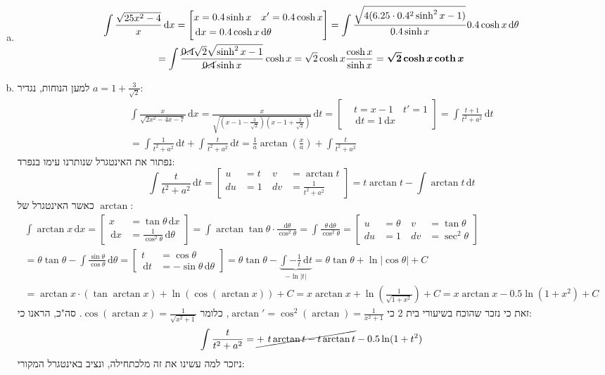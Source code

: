 \documentclass[]{article}
\newcommand\tant  {\tan \theta}
\newcommand\sinhx {\sinh x}
\newcommand\coshx {\cosh x}
\newcommand\dx    {\,\mathrm{d}x}
\newcommand\dt    {\,\mathrm{d}t}
\newcommand\dtt   {\,\mathrm{d}\theta}
\newcommand\pt[3]{\csb{\begin{aligned}
			&t = #1 \quad t' = #2 \\
			&\dt = #2 \dx #3
\end{aligned}}}
\newcommand\pts[2]{\csb{\begin{aligned}
t &= #1 \quad \\
\dt &= #2
\end{aligned}}}
\newcommand\px[3]{\csb{\begin{aligned}
&x = #1 \quad x' = #2 \\
&\dx = #2 #3
\end{aligned}}}
\newcommand\pxs[2]{\csb{\begin{aligned}
x &= #1\\
\dx &= #2
\end{aligned}}}
\newcommand\udv[4]{\csb{\begin{aligned}
			u &= #1  \ & v &= #3 \\
			du &= #2 \ & dv &= #4
\end{aligned}}}
\newcommand\ta    {\theta}
\newcommand\cl [1]    {\left ( #1 \right )}
\newcommand\csb[1]    {\left [ #1 \right ]}
\begin{document}
	\section{}
	\begin{enumerate}[a.]
		\item 
			\begin{multline*}
				\int \frac{\sqrt{25x^2 - 4}}{x}\dx = \px{0.4\sinhx}{0.4\coshx}{\dtt} = \int \frac{\sqrt{4(6.25 \cdot 0.4^2\sinh^2x - 1)}}{0.4\sinhx} 0.4\coshx\dtt \\
				= \int \frac{\cancel{0.4}\sqrt2\sqrt{\sinh^2x - 1}}{\cancel{0.4}\sinhx}\coshx = \sqrt{2}\coshx \frac{\coshx}{\sinhx} = \bm{\sqrt2 \coshx \coth x}
			\end{multline*}
		\item למען הנוחות, נגדיר $a = 1 + \frac{3}{\sqrt2}$: 
			\begin{multline*}
				\int \frac{x}{\sqrt{2x^2 - 4x - 7}} \dx = \frac{x}{\sqrt{\cl{x - 1 - \frac{3}{\sqrt2}}\cl{x - 1 + \frac{3}{\sqrt2}}}} \dt = \pt{x - 1}{1}{} = \int \frac{t + 1}{t^2 + a^2}\dt \\
				= \int \frac{1}{t^2 + a^2} \dt + \int \frac{t}{t^2 + a^2} \dt = \frac{1}{a}\arctan\cl{\frac{x}{a}} + \int \frac{t}{t^2 + a^2}
			\end{multline*}
			נפתור את האינטגרל שנותרנו עימו בנפרד: 
			\[ \int \frac{t}{t^2 + a^2} \dt = \udv{t}{1}{\arctan t}{\tfrac{1}{t^2 + a^2}} = t \arctan t - \int \arctan t \dt \]
			כאשר האינטגרל של $\arctan$: 
			\begin{multline*}
				\int \arctan x \dx = \pxs{\tant\dx}{\tfrac{1}{\cos^2\ta}\dtt} = \int \arctan \tant \cdot \frac{\dtt}{\cos^2 \ta} = \int \frac{\ta \dtt}{\cos^2\ta} = \udv{\ta}{1}{\tan\ta}{\sec^2\ta} \\
				= \ta \tan \ta - \int \frac{\sin\ta}{\cos\ta}\dtt = \pts{\cos \ta}{-\sin \ta \dtt} = \ta \tan \ta  - \underbrace{\int -\frac{1}{t} \dt}_{-\ln |t|} = \ta \tan \ta + \ln |\cos \ta| + C \\
				= \arctan x \cdot (\tan \arctan x) + \ln (\cos(\arctan x)) + C = x \arctan x + \ln \cl{\tfrac{1}{\sqrt{1 + x^2}}} + C = x\arctan x - 0.5 \ln (1 + x^2) + C
			\end{multline*}
			זאת כי נזכר שהוכח בשיעורי בית 2 כי $\arctan' = \cos^2(\arctan) = \frac{1}{x^2 + 1}$, כלומר $\cos(\arctan x) = \frac{1}{\sqrt{x^2 + 1}}$. סה"כ, הראנו כי: 
			\[ \int \frac{t}{t^2 + a^2} = \cancel{+\ t \arctan t - t \arctan t} - 0.5\ln(1 + t^2) \]
			ניזכר למה עשינו את זה מלכתחילה, ונציב באינטגרל המקורי: 
			\begin{multline*}

\end{multline*}
\end{enumerate}
\end{document}

